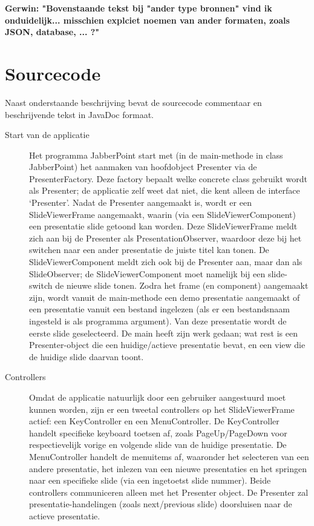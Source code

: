 \documentclass[a4paper]{article}
\begin{document}
\textbf{Gerwin: "Bovenstaande tekst bij "ander type bronnen" vind ik onduidelijk... misschien explciet noemen van ander formaten, zoals JSON, database, ... ?"}

\section{Sourcecode}
Naast onderstaande beschrijving bevat de sourcecode commentaar en beschrijvende tekst in JavaDoc formaat.

\begin{description}
\item[Start van de applicatie] Het programma JabberPoint start met (in de main-methode in class JabberPoint) het aanmaken van hoofdobject Presenter via de PresenterFactory. Deze factory bepaalt welke concrete class gebruikt wordt als Presenter; de applicatie zelf weet dat niet, die kent alleen de interface ‘Presenter’.
Nadat de Presenter aangemaakt is, wordt er een SlideViewerFrame aangemaakt, waarin (via een SlideViewerComponent) een presentatie slide getoond kan worden. Deze SlideViewerFrame meldt zich aan bij de Presenter als PresentationObserver, waardoor deze bij het switchen naar een ander presentatie de juiste titel kan tonen. De SlideViewerComponent meldt zich ook bij de Presenter aan, maar dan als SlideObserver; de SlideViewerComponent moet namelijk bij een slide-switch de nieuwe slide tonen.
Zodra het frame (en component) aangemaakt zijn, wordt vanuit de main-methode een demo presentatie aangemaakt of een presentatie vanuit een bestand ingelezen (als er een bestandsnaam ingesteld is als programma argument). Van deze presentatie wordt de eerste slide geselecteerd.
De main heeft zijn werk gedaan; wat rest is een Presenter-object die een huidige/actieve presentatie bevat, en een view die de huidige slide daarvan toont.
\item[Controllers]
Omdat de applicatie natuurlijk door een gebruiker aangestuurd moet kunnen worden, zijn er een tweetal controllers op het SlideViewerFrame actief: een KeyController en een MenuController. De KeyController handelt specifieke keyboard toetsen af, zoals PageUp/PageDown voor respectievelijk vorige en volgende slide van de huidige presentatie. De MenuController handelt de menuitems af, waaronder het selecteren van een andere presentatie, het inlezen van een nieuwe presentaties en het springen naar een specifieke slide (via een ingetoetst slide nummer). Beide controllers communiceren alleen met het Presenter object. De Presenter zal presentatie-handelingen (zoals next/previous slide) doorsluisen naar de actieve presentatie.

\end{description}
\end{document}
